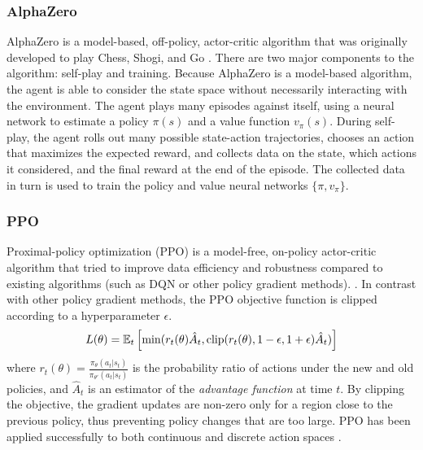 \subsubsection{AlphaZero}


AlphaZero is a model-based, off-policy, actor-critic algorithm that was originally developed to play Chess, Shogi, and Go \cite{Silver1140}. There are two major components to the algorithm: self-play and training. Because AlphaZero is a model-based algorithm, the agent is able to consider the state space without necessarily interacting with the environment. The agent plays many episodes against itself, using a neural network to estimate a policy $\pi(s)$ and a value function $v_\pi(s)$. During self-play, the agent rolls out many possible state-action trajectories, chooses an action that maximizes the expected reward, and collects data on the state, which actions it considered, and the final reward at the end of the episode. The collected data in turn is used to train the policy and value neural networks $\{ \pi, v_\pi \}$.


\subsubsection{PPO}

Proximal-policy optimization (PPO) is a model-free, on-policy actor-critic algorithm that tried to improve data efficiency and robustness compared to existing algorithms (such as DQN or other policy gradient methods).
\cite{schulman2017proximal}.
In contrast with other policy gradient methods, the PPO objective function is clipped according to a hyperparameter $\epsilon$.
\begin{equation}\label{eq:ppo_loss}
    L(\theta) = \mathbb E_t \left[\min(
        r_t(\theta)\hat{A}_t,
        \text{clip}(r_t(\theta), 1-\epsilon, 1+\epsilon) \hat{A}_t
    )\right]
\end{equation}
where
$r_t(\theta) = \frac{\pi_\theta(a_t|s_t)}{\pi_{\theta'}(a_t|s_t)}$ is the probability ratio of actions under the new and old policies, and $\hat{A}_t$ is an estimator of the \emph{advantage function} at time $t$. By clipping the objective, the gradient updates are non-zero only for a region close to the previous policy, thus preventing policy changes that are too large.
PPO has been applied successfully to both continuous and discrete action spaces%
.

